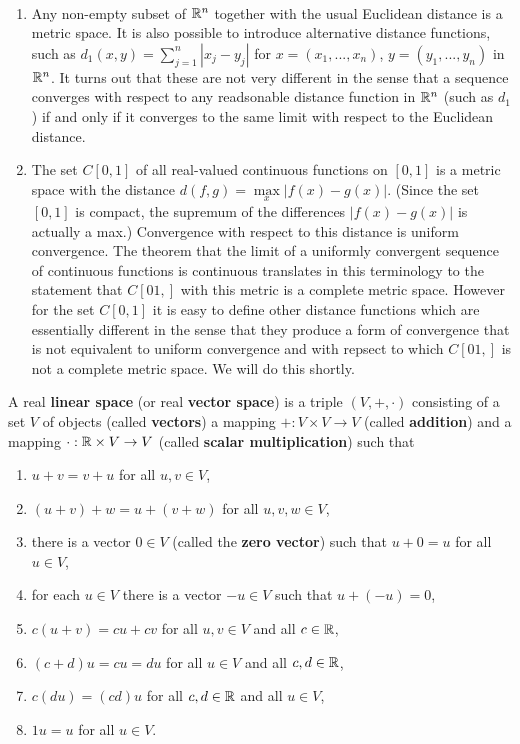 \begin{ex}~%
	\begin{enumerate}
	\item Any non-empty subset of $\mathbb{R}^n$ together with the usual Euclidean distance 
		is a metric space. It is also possible to introduce alternative distance 
		functions, such as $d_1(x,y) = \sum\limits_{j=1}^n|x_j-y_j|$ for 
		$x=(x_1,...,x_n)$, $y=(y_1,...,y_n)$ in $\mathbb{R}^n$. It turns out that these 
		are not very different in the sense that a sequence converges with respect 
		to any readsonable distance function in $\mathbb{R}^n$ (such as $d_1$) if and only 
		if it converges to the same limit with respect to the Euclidean distance.
	\item The set $C[0,1]$ of all real-valued continuous functions on $[0,1]$ is a 
		metric space with the distance $d(f,g) = \max\limits_{x}|f(x)-g(x)|$. 
		(Since the set $[0,1]$ is compact, the supremum of the differences 
		$|f(x)-g(x)|$ is actually a max.) Convergence with respect to this distance 
		is uniform convergence. The theorem that the limit of a uniformly convergent 
		sequence of continuous functions is continuous translates in this terminology 
		to the statement that $C[01,]$ with this metric is a complete metric space. 
		However for the set $C[0,1]$ it is easy to define other distance functions 
		which are essentially different in the sense that they produce a form of 
		convergence that is not equivalent to uniform convergence and with repsect to 
		which $C[01,]$ is not a complete metric space. We will do this shortly. 
	\end{enumerate}
\end{ex}

\begin{defn} %
	A real \textbf{linear space} (or real \textbf{vector space}) is a triple 
	$(V,+,\cdot)$ consisting of a set $V$ of objects (called \textbf{vectors}) a 
	mapping $+:V\times V\rightarrow V$ (called \textbf{addition}) and a mapping 
	$\cdot : \mathbb{R} \times V \rightarrow V$ (called \textbf{scalar multiplication}) 
	such that 
	\begin{enumerate}
	\item $u + v = v + u$ for all $u, v \in V$, 
	\item $(u + v) + w = u + (v + w)$ for all $u, v, w \in V$, 
	\item there is a vector $0 \in V$ (called the \textbf{zero vector}) such that 
		$u + 0 = u$ for all $u \in V$,
	\item for each $u \in V$ there is a vector $-u \in V$ such that $u + (-u) = 0$, 
	\item $c(u + v) = cu + cv$ for all $u, v \in V$ and all $c \in \mathbb{R}$, 
	\item $(c + d)u = cu = du$ for all $u \in V$ and all $c, d\in \mathbb{R}$,  
	\item $c(du) = (cd)u$ for all $c, d \in \mathbb{R}$ and all $u \in V$, 
	\item $1u = u$ for all $u \in V$. 
	\end{enumerate}
\end{defn}

